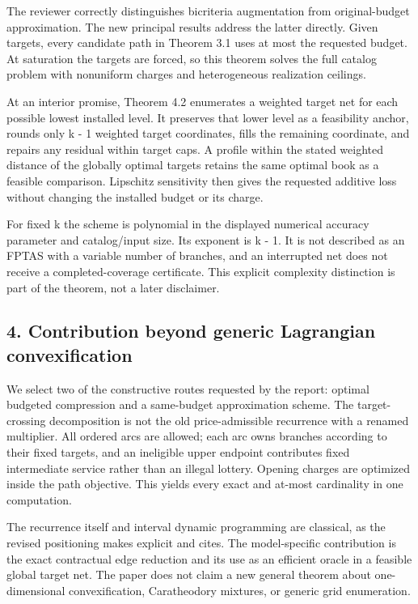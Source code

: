 \documentclass[11pt,letterpaper]{article}
\begin{document}
The reviewer correctly distinguishes bicriteria augmentation from original-budget approximation. The new principal results address the latter directly. Given targets, every candidate path in Theorem 3.1 uses at most the requested budget. At saturation the targets are forced, so this theorem solves the full catalog problem with nonuniform charges and heterogeneous realization ceilings.



At an interior promise, Theorem 4.2 enumerates a weighted target net for each possible lowest installed level. It preserves that lower level as a feasibility anchor, rounds only k - 1 weighted target coordinates, fills the remaining coordinate, and repairs any residual within target caps. A profile within the stated weighted distance of the globally optimal targets retains the same optimal book as a feasible comparison. Lipschitz sensitivity then gives the requested additive loss without changing the installed budget or its charge.



For fixed k the scheme is polynomial in the displayed numerical accuracy parameter and catalog/input size. Its exponent is k - 1. It is not described as an FPTAS with a variable number of branches, and an interrupted net does not receive a completed-coverage certificate. This explicit complexity distinction is part of the theorem, not a later disclaimer.



\subsection*{4. Contribution beyond generic Lagrangian convexification}


We select two of the constructive routes requested by the report: optimal budgeted compression and a same-budget approximation scheme. The target-crossing decomposition is not the old price-admissible recurrence with a renamed multiplier. All ordered arcs are allowed; each arc owns branches according to their fixed targets, and an ineligible upper endpoint contributes fixed intermediate service rather than an illegal lottery. Opening charges are optimized inside the path objective. This yields every exact and at-most cardinality in one computation.



The recurrence itself and interval dynamic programming are classical, as the revised positioning makes explicit and cites. The model-specific contribution is the exact contractual edge reduction and its use as an efficient oracle in a feasible global target net. The paper does not claim a new general theorem about one-dimensional convexification, Caratheodory mixtures, or generic grid enumeration.
\end{document}
